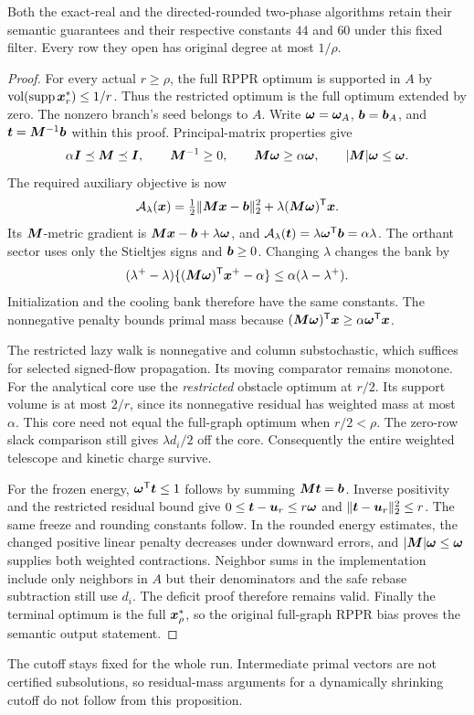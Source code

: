 \begin{proposition}
\label{prop:revisit-fixed-pruning}
Both the exact-real and the directed-rounded two-phase algorithms retain
their semantic guarantees and their respective constants $44$ and $60$
under this fixed filter. Every row they open has original degree at most
$1/\rho$.
\end{proposition}
\begin{proof}
For every actual $r\geq\rho$, the full RPPR optimum is supported in $A$
by $\operatorname{vol}(\operatorname{supp}\bm{x}_r^*)\leq1/r$. Thus the restricted optimum is the
full optimum extended by zero. The nonzero branch's seed belongs to $A$.
Write $\bm{\omega}=\bm{\omega}_A$, $\bm{b}=\bm{b}_A$, and
$\bm{t}=\bm{M}^{-1}\bm{b}$ within this proof. Principal-matrix properties give
\[
 \alpha\bm{I}\preceq\bm{M}\preceq\bm{I},\qquad \bm{M}^{-1}\geq0,
 \qquad \bm{M}\bm{\omega}\geq\alpha\bm{\omega},
 \qquad |\bm{M}|\bm{\omega}\leq\bm{\omega}.
\]
The required auxiliary objective is now
\[
 \mathcal A_\lambda(\bm{x})=\tfrac12\|\bm{M}\bm{x}-\bm{b}\|_2^2
                            +\lambda(\bm{M}\bm{\omega})^{\mathsf{T}}\bm{x}.
\]
Its $\bm{M}$-metric gradient is $\bm{M}\bm{x}-\bm{b}+\lambda\bm{\omega}$,
and $\mathcal A_\lambda(\bm{t})=\lambda\bm{\omega}^{\mathsf{T}}\bm{b}=\alpha\lambda$.
The orthant sector uses only the Stieltjes signs and $\bm{b}\geq0$.
Changing $\lambda$ changes the bank by
\[
 (\lambda^+-\lambda)
       \{(\bm{M}\bm{\omega})^{\mathsf{T}}\bm{x}^+-\alpha\}
 \leq\alpha(\lambda-\lambda^+).
\]
Initialization and the cooling bank therefore have the same constants.
The nonnegative penalty bounds primal mass because
$(\bm{M}\bm{\omega})^{\mathsf{T}}\bm{x}\geq\alpha\bm{\omega}^{\mathsf{T}}\bm{x}$.

The restricted lazy walk is nonnegative and column substochastic, which
suffices for selected signed-flow propagation. Its moving comparator
remains monotone. For the analytical core use the \emph{restricted}
obstacle optimum at $r/2$. Its support volume is at most $2/r$, since
its nonnegative residual has weighted mass at most $\alpha$.
This core need not equal the full-graph optimum when $r/2<\rho$.
The zero-row slack comparison still gives $\lambda d_i/2$ off the core.
Consequently the entire weighted telescope and kinetic charge survive.

For the frozen energy, $\bm{\omega}^{\mathsf{T}}\bm{t}\leq1$ follows by summing
$\bm{M}\bm{t}=\bm{b}$. Inverse positivity and the restricted residual bound give
$0\leq\bm{t}-\bm{u}_r\leq r\bm{\omega}$ and
$\|\bm{t}-\bm{u}_r\|_2^2\leq r$. The same freeze and rounding constants
follow. In the rounded energy estimates, the changed positive linear
penalty decreases under downward errors, and $|\bm{M}|\bm{\omega}\leq\bm{\omega}$
supplies both weighted contractions. Neighbor sums in the implementation
include only neighbors in $A$ but their denominators and the safe rebase
subtraction still use $d_i$. The deficit proof therefore remains valid.
Finally the terminal optimum is the full $\bm{x}_\rho^*$, so the original
full-graph RPPR bias proves the semantic output statement.
\end{proof}

The cutoff stays fixed for the whole run. Intermediate primal vectors are
not certified subsolutions, so residual-mass arguments for a dynamically
shrinking cutoff do not follow from this proposition.

